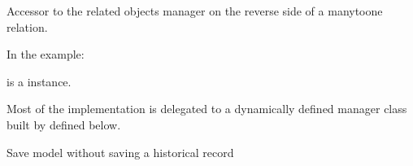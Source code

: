 \documentclass[letterpaper,10pt,english]{sphinxmanual}
\begin{document}
\begin{fulllineitems}
\begin{fulllineitems}
\label{\detokenize{pages_app.models:pages_app.models.Block.objects}}
\pysigstartsignatures
\pysigline
{}
\pysigstopsignatures
\end{fulllineitems}


\begin{fulllineitems}
\label{\detokenize{pages_app.models:pages_app.models.Block.pageblock_set}}
\pysigstartsignatures
\pysigline
{}
\pysigstopsignatures
\sphinxAtStartPar
Accessor to the related objects manager on the reverse side of a
many\sphinxhyphen{}to\sphinxhyphen{}one relation.

\sphinxAtStartPar
In the example:

\begin{sphinxVerbatim}[commandchars=\\\{\}]
 
       
\end{sphinxVerbatim}

\sphinxAtStartPar
{} is a  instance.

\sphinxAtStartPar
Most of the implementation is delegated to a dynamically defined manager
class built by  defined below.

\end{fulllineitems}


\begin{fulllineitems}
\label{\detokenize{pages_app.models:pages_app.models.Block.save_without_historical_record}}
\pysigstartsignatures
\pysiglinewithargsret
{}
{\sphinxparamcomma {}}
{}
\pysigstopsignatures
\sphinxAtStartPar
Save model without saving a historical record


\end{fulllineitems}
\end{fulllineitems}
\end{document}
